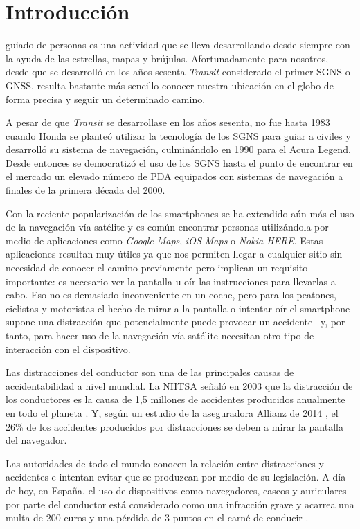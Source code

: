 \chapter{Introducción}
\label{chap:intro}

 guiado de personas es una actividad que se lleva desarrollando desde siempre con la
ayuda de las estrellas, mapas y brújulas. Afortunadamente para nosotros, desde que se desarrolló en
los años sesenta \textit{Transit} considerado el primer \acf{SGNS} o \acf{GNSS}, resulta bastante
más sencillo conocer nuestra ubicación en el globo de forma precisa y seguir un determinado camino.

A pesar de que \textit{Transit} se desarrollase en los años sesenta, no fue hasta 1983 cuando Honda
se planteó utilizar la tecnología de los \acs{SGNS} para guiar a civiles y desarrolló su sistema de
navegación, culminándolo en 1990 para el Acura Legend. Desde entonces se democratizó el uso de los
\acs{SGNS} hasta el punto de encontrar en el mercado un elevado número de \acf{PDA} equipados con
sistemas de navegación a finales de la primera década del 2000.

Con la reciente popularización de los smartphones se ha extendido aún más el uso de la navegación
vía satélite y es común encontrar personas utilizándola por medio de aplicaciones como
\textit{Google Maps}, \textit{iOS Maps} o \textit{Nokia HERE}. Estas aplicaciones
resultan muy útiles ya que nos permiten llegar a cualquier sitio sin necesidad de conocer el camino
previamente pero implican un requisito importante: es necesario ver la pantalla u oír las
instrucciones para llevarlas a cabo. Eso no es demasiado inconveniente en un coche, pero para los
peatones, ciclistas y motoristas el hecho de mirar a la pantalla o intentar oír el smartphone supone
una distracción que potencialmente puede provocar un accidente~\cite{Valcarcel12} y, por tanto, para
hacer uso de la navegación vía satélite necesitan otro tipo de interacción con el dispositivo.

Las distracciones del conductor son una de las principales causas de accidentabilidad a nivel
mundial. La \acf{NHTSA} señaló en 2003 que la distracción de los conductores es la causa de 1,5
millones de accidentes producidos anualmente en todo el planeta \cite{RACC03}. Y, según un estudio
de la aseguradora Allianz de 2014 \cite{Allianz14}, el 26\% de los accidentes producidos por
distracciones se deben a mirar la pantalla del navegador.

Las autoridades de todo el mundo conocen la relación entre distracciones y accidentes e intentan
evitar que se produzcan por medio de su legislación. A día de hoy, en España, el uso de dispositivos
como navegadores, cascos y auriculares por parte del conductor está considerado como una infracción
grave y acarrea una multa de 200 euros y una pérdida de 3 puntos en el carné de conducir
\cite{Serrano14} .

